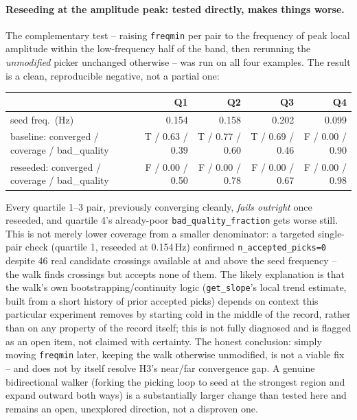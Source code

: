 \documentclass[11pt]{article}
\begin{document}
\paragraph{Reseeding at the amplitude peak: tested directly, makes things worse.} The complementary
test -- raising \texttt{freqmin} per pair to the frequency of peak local amplitude within the
low-frequency half of the band, then rerunning the \emph{unmodified} picker unchanged otherwise --
was run on all four examples. The result is a clean, reproducible negative, not a partial one:
\begin{center}
\begin{tabular}{lrrrr}
\toprule
 & Q1 & Q2 & Q3 & Q4 \\
\midrule
seed freq.\ (Hz) & 0.154 & 0.158 & 0.202 & 0.099 \\
baseline: converged / coverage / bad\_quality & T / 0.63 / 0.39 & T / 0.77 / 0.60 & T / 0.69 / 0.46 & F / 0.00 / 0.90 \\
reseeded: converged / coverage / bad\_quality & F / 0.00 / 0.50 & F / 0.00 / 0.78 & F / 0.00 / 0.67 & F / 0.00 / 0.98 \\
\bottomrule
\end{tabular}
\end{center}
Every quartile 1--3 pair, previously converging cleanly, \emph{fails outright} once reseeded, and
quartile 4's already-poor \texttt{bad\_quality\_fraction} gets worse still. This is not merely
lower coverage from a smaller denominator: a targeted single-pair check (quartile 1, reseeded at
0.154\,Hz) confirmed \texttt{n\_accepted\_picks=0} despite 46 real candidate crossings available
at and above the seed frequency -- the walk finds crossings but accepts none of them. The likely
explanation is that the walk's own bootstrapping/continuity logic (\texttt{get\_slope}'s local
trend estimate, built from a short history of prior accepted picks) depends on context this
particular experiment removes by starting cold in the middle of the record, rather than on any
property of the record itself; this is not fully diagnosed and is flagged as an open item, not
claimed with certainty. The honest conclusion: simply moving \texttt{freqmin} later, keeping the
walk otherwise unmodified, is not a viable fix -- and does not by itself resolve H3's near/far
convergence gap. A genuine bidirectional walker (forking the picking loop to seed at the strongest
region and expand outward both ways) is a substantially larger change than tested here and remains
an open, unexplored direction, not a disproven one.
\end{document}

